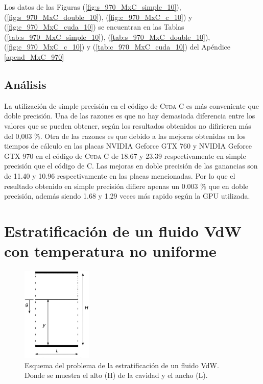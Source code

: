 Los datos de las Figuras (\ref{fig:s_970_MxC_simple_10}), (\ref{fig:s_970_MxC_double_10}), (\ref{fig:c_970_MxC_c_10}) y (\ref{fig:c_970_MxC_cuda_10}) se encuentran en las Tablas (\ref{tab:s_970_MxC_simple_10}), (\ref{tab:s_970_MxC_double_10}), (\ref{fig:c_970_MxC_c_10}) y (\ref{tab:c_970_MxC_cuda_10}) del Apéndice \ref{apend_MxC_970}


\subsection{Análisis}

La utilización de simple precisión en el código de \textsc{Cuda C} es más conveniente que doble precisión. Una de las razones es que no hay demasiada diferencia entre los valores que se pueden obtener, según los resultados obtenidos no difirieren más del 0,003 \%. Otra de las razones es que debido a las mejoras obtenidas en los tiempos de cálculo en las placas NVIDIA Geforce GTX 760 y NVIDIA Geforce GTX 970 en el código de \textsc{Cuda C} de 18.67 y 23.39 respectivamente en simple precisión que el código de \textsc{C}. Las mejoras en doble precisión de las ganancias son de 11.40 y 10.96 respectivamente en las placas mencionadas. Por lo que el resultado obtenido en simple precisión difiere apenas un 0.003 \% que en doble precisión, además siendo 1.68 y 1.29 veces más rapido según la GPU utilizada.

\newpage

\section{Estratificación de un fluido VdW con temperatura no uniforme}

\begin{figure}[htbp]
	\centering
	\includegraphics[width=0.3\textwidth]{figs/cap4/esquema_problema_VdW}
	\caption{Esquema del problema de la estratificación de un fluido VdW. Donde se muestra el alto (H) de la cavidad y el ancho (L).} 
	\label{fig:esquema_VdW}	
\end{figure}

